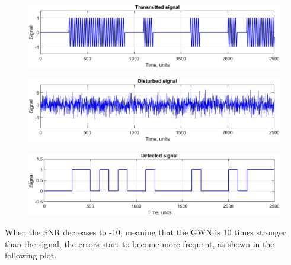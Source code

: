 \begin{figure}[h!]
    \centering
    \includegraphics[width = .85\textwidth]{lab-2/imgs/task8.4_Transmitted.jpg}
\end{figure}
\vspace{-15px}
\begin{figure}[h!]
    \centering
    \includegraphics[width = .85\textwidth]{lab-2/imgs/task8.4_Noise.jpg}
\end{figure}
\vspace{-15px}
\begin{figure}[h!]
    \centering
    \includegraphics[width = .85\textwidth]{lab-2/imgs/task8.4_Detected_Error.jpg}
\end{figure}

\FloatBarrier\noindent When the SNR decreases to -10, meaning that the GWN is 10 times stronger than the signal, the errors start to become more frequent, as shown in the following plot.

